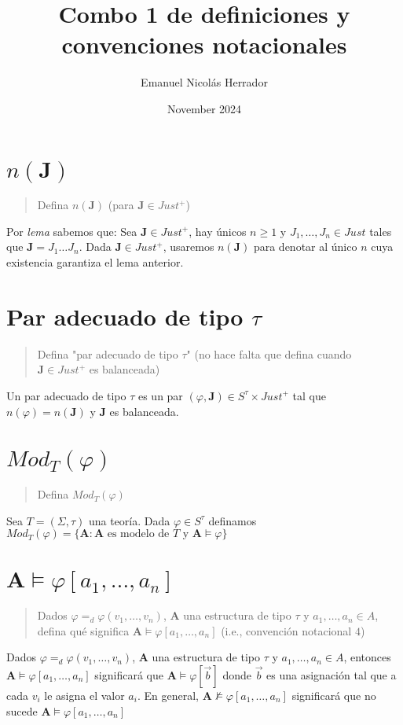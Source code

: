 \documentclass{article}
\title{Combo 1 de definiciones y convenciones notacionales}
\author{Emanuel Nicolás Herrador}
\date{November 2024}
\begin{document}
\maketitle

\section{$n(\mathbf{J})$}
\begin{quote}
    Defina $n(\mathbf{J})$ (para $\mathbf{J}\in Just^+$)
\end{quote}
Por \textit{lema} sabemos que: Sea $\mathbf{J}\in Just^+$, hay únicos $n\geq 1$ y $J_1,\dots,J_n\in Just$ tales que $\mathbf{J}=J_1\dots J_n$.
\newline
Dada $\mathbf{J}\in Just^+$, usaremos $n(\mathbf{J})$ para denotar al único $n$ cuya existencia garantiza el lema anterior.

\section{Par adecuado de tipo $\tau$}
\begin{quote}
    Defina "par adecuado de tipo $\tau$" (no hace falta que defina cuando $\mathbf{J}\in Just^+$ es balanceada)
\end{quote}
Un par adecuado de tipo $\tau$ es un par $(\varphi,\mathbf{J})\in S^\tau\times Just^+$ tal que $n(\varphi)=n(\mathbf{J})$ y $\mathbf{J}$ es balanceada.

\section{$Mod_T(\varphi)$}
\begin{quote}
    Defina $Mod_T(\varphi)$
\end{quote}
Sea $T=(\Sigma,\tau)$ una teoría. Dada $\varphi\in S^\tau$ definamos $Mod_T(\varphi)=\{\mathbf{A}:\mathbf{A}\text{ es modelo de }T\text{ y }\mathbf{A}\vDash\varphi\}$

\section{$\mathbf{A}\vDash\varphi[a_1,\dots,a_n]$}
\begin{quote}
    Dados $\varphi=_d\varphi(v_1,\dots,v_n)$, $\mathbf{A}$ una estructura de tipo $\tau$ y $a_1,\dots,a_n\in A$, defina qué significa $\mathbf{A}\vDash\varphi[a_1,\dots,a_n]$ (i.e., convención notacional $4$)
\end{quote}
Dados $\varphi=_d\varphi(v_1,\dots,v_n)$, $\mathbf{A}$ una estructura de tipo $\tau$ y $a_1,\dots,a_n\in A$, entonces $\mathbf{A}\vDash\varphi[a_1,\dots,a_n]$ significará que $\mathbf{A}\vDash\varphi[\vec{b}]$ donde $\vec{b}$ es una asignación tal que a cada $v_i$ le asigna el valor $a_i$.
\newline
En general, $\mathbf{A}\nvDash\varphi[a_1,\dots,a_n]$ significará que no sucede $\mathbf{A}\vDash\varphi[a_1,\dots,a_n]$
\end{document}
